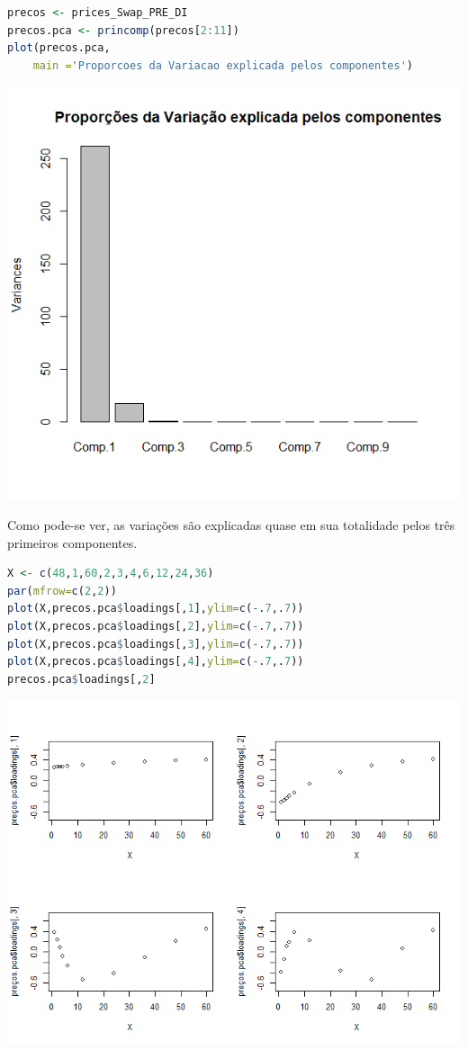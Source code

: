\documentclass[12pt]{article}
\begin{document}
\begin{lstlisting}[language=R]
precos <- prices_Swap_PRE_DI
precos.pca <- princomp(precos[2:11])
plot(precos.pca, 
	main ='Proporcoes da Variacao explicada pelos componentes')
\end{lstlisting}

\begin{center}
	\includegraphics*[scale=0.8]{9.png}
\end{center}

Como pode-se ver, as variações são explicadas quase em sua totalidade pelos três primeiros componentes.

\begin{lstlisting}[language=R]
X <- c(48,1,60,2,3,4,6,12,24,36)
par(mfrow=c(2,2))
plot(X,precos.pca$loadings[,1],ylim=c(-.7,.7))
plot(X,precos.pca$loadings[,2],ylim=c(-.7,.7))
plot(X,precos.pca$loadings[,3],ylim=c(-.7,.7))
plot(X,precos.pca$loadings[,4],ylim=c(-.7,.7))
precos.pca$loadings[,2]
\end{lstlisting}

\begin{center}
	\includegraphics*[scale=0.8]{10.png}
\end{center}
\end{document}
